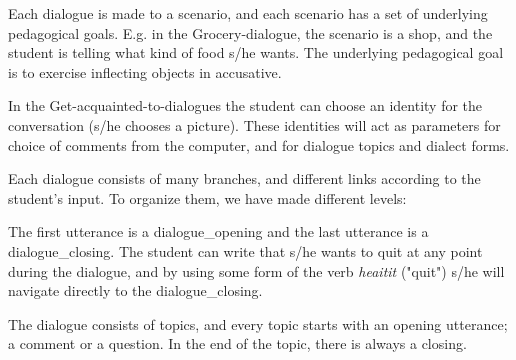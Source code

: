 \documentclass[11pt]{article}
\begin{document}
Each dialogue is made to a scenario, and each scenario has a set of underlying pedagogical goals. E.g. in the Grocery-dialogue, the scenario is a shop, and the student is telling what kind of food s/he wants. The underlying pedagogical goal is to exercise inflecting objects in accusative.


In the Get-acquainted-to-dialogues the student can choose an identity for the conversation (s/he chooses a picture). These identities will act as parameters for choice of comments from the computer, and for dialogue topics and dialect forms.

%	


Each dialogue consists of many branches, and different links according to the student's input. To organize them, we have made different levels:

The first utterance is a dialogue\_opening and the last utterance is a dialogue\_closing. The student can write that s/he wants to quit at any point during the dialogue, and by using some form of the verb \textit{heaitit} ("quit") s/he will navigate directly to the dialogue\_closing.

The dialogue consists of topics, and every topic starts with an opening utterance; a comment or a question. In the end of the topic, there is always a closing.  
\end{document}
